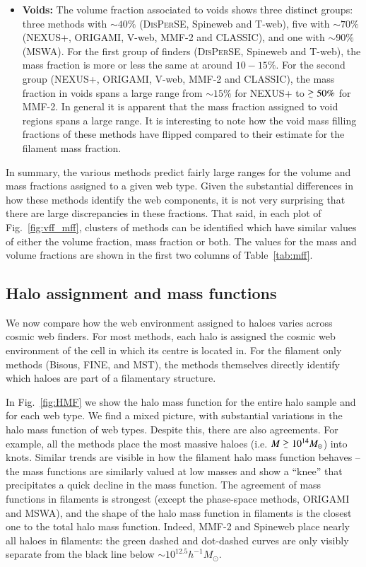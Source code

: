 \documentclass[useAMS,usenatbib]{mnras}
\def\gsim{\mathrel{\lower0.6ex\hbox{$\buildrel {\textstyle >}
 \over {\scriptstyle \sim}$}}}
\newcommand{\bisous}{Bisous}
\newcommand{\classic}{\textsc{CLASSIC}}
\newcommand{\disperse}{\textsc{DisPerSE}}
\newcommand{\fine}{\textsc{FINE}}
\newcommand{\origami}{\textsc{ORIGAMI}}
\newcommand{\mst}{\textsc{MST}}
\newcommand{\nexus}{\textsc{NEXUS+}}
\newcommand{\tweb}{T-web}
\newcommand{\vweb}{V-web}
\newcommand{\mswa}{\textsc{MSWA}}
\newcommand{\mmft}{\textsc{MMF-2}}
\newcommand{\spine}{Spineweb}
\begin{document}
\begin{itemize}
\item {\bf Voids:} The volume fraction associated to voids shows three distinct groups: three methods with $\sim 40\%$ (\disperse{}, \spine{} and \tweb{}), five with $\sim 70\%$ (\nexus{}, \origami{}, \vweb{}, \mmft{} and \classic{}), and one with $\sim90\%$ (\mswa{}).  For the first group of finders (\disperse{}, \spine{} and \tweb{}), the mass fraction is more or less the same at around $10-15\%$. For the second group (\nexus{}, \origami{}, \vweb{}, \mmft{} and \classic{}), the mass fraction in voids spans a large range from $\sim 15\%$ for \nexus{} to $\gsim50\%$ for \mmft{}. In general it is apparent that the mass fraction assigned to void regions spans a large range. It is interesting to note how the void mass filling fractions of these methods have flipped compared to their estimate for the filament mass fraction.
\end{itemize}

In summary, the various methods predict fairly large ranges for the volume and mass fractions assigned to a given web type. Given the substantial differences in how these methods identify the web components, it is not very surprising that there are large discrepancies in these fractions. That said, in each plot of Fig.~\ref{fig:vff_mff}, clusters of methods can be identified which have similar values of either the volume fraction, mass fraction or both. The values for the mass and volume fractions are shown in the first two columns of Table~\ref{tab:mff}.

\subsection{Halo assignment and mass functions}
We now compare how the web environment assigned to haloes varies across cosmic web finders.  For most methods, each halo is assigned the cosmic web environment of the cell in which its centre is located in. For the filament only methods (\bisous{}, \fine{}, and \mst{}), the methods themselves directly identify which haloes are part of a filamentary structure. 

In Fig.~\ref{fig:HMF} we show the halo mass function for the entire halo sample and for each web type. We find a mixed picture, with substantial variations in the halo mass function of web types. Despite this, there are also agreements. For example, all the methods place the most massive haloes (i.e. $M \gsim 10^{14}M_{\odot}$) into knots. Similar trends are visible in how the filament halo mass function behaves -- the mass functions are similarly valued at low masses and show a ``knee'' that precipitates a quick decline in the mass function. The agreement of mass functions in filaments is strongest (except the phase-space methods, \origami{} and \mswa{}), and the shape of the halo mass function in filaments is the closest one to the total halo mass function. Indeed, \mmft{} and \spine{} place nearly all haloes in filaments: the green dashed and dot-dashed curves are only visibly separate from the black line below $\sim10^{12.5}h^{-1}M_{\odot}$.
\end{document}

